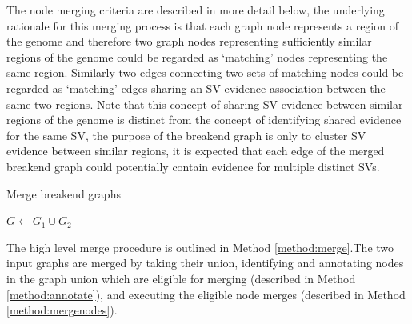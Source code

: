 \documentclass{article}
\begin{document}
The node merging criteria are described in more detail below, the underlying rationale for this merging process is that each graph node represents a region of the genome and therefore two graph nodes representing sufficiently similar regions of the genome could be regarded as `matching' nodes representing the same region. Similarly two edges connecting two sets of matching nodes could be regarded as `matching' edges sharing an SV evidence association between the same two regions. Note that this concept of sharing SV evidence between similar regions of the genome is distinct from the concept of identifying shared evidence for the same SV, the purpose of the breakend graph is only to cluster SV evidence between similar regions, it is expected that each edge of the merged breakend graph could potentially contain evidence for multiple distinct SVs.

\renewcommand{\algorithmicrequire}{\textbf{Input:}}
\renewcommand{\algorithmicensure}{\textbf{Output:}}
\newcommand*\Let[2]{\State #1 $\gets$ #2}


\begin{algorithm}[h]
\caption{Merge breakend graphs}
\label{method:merge}
\begin{algorithmic}[1]

\State $G \gets G_1 \cup G_2$
\State {}
\State {}
\EndProcedure
\end{algorithmic}
\end{algorithm}

The high level merge procedure is outlined in Method \ref{method:merge}.The two input graphs are merged by taking their union, identifying and annotating nodes in the graph union which are eligible for merging (described in Method \ref{method:annotate}), and executing the eligible node merges (described in Method \ref{method:mergenodes}).
\end{document}
